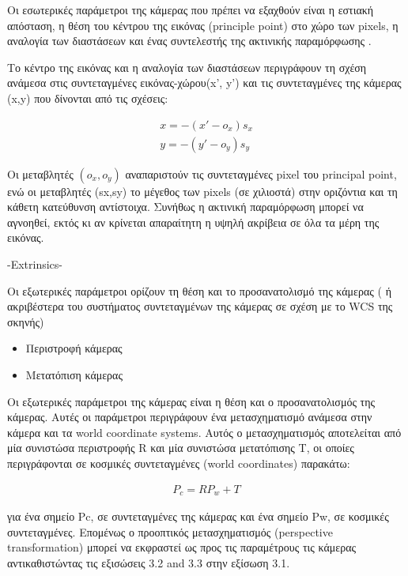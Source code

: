 Οι εσωτερικές παράμετροι της κάμερας που πρέπει να εξαχθούν είναι η εστιακή απόσταση, η θέση του κέντρου της εικόνας (principle point) στο χώρο των pixels, η αναλογία των διαστάσεων και ένας συντελεστής της ακτινικής παραμόρφωσης \cite{Malik2002}. 



Το κέντρο της εικόνας και η αναλογία των διαστάσεων περιγράφουν τη σχέση ανάμεσα στις συντεταγμένες εικόνας-χώρου(x', y') και τις συντεταγμένες της κάμερας (x,y) που δίνονται από τις σχέσεις:

\begin{equation}
\begin{aligned}
x=-(x'-o_{x})s_{x}
\\
y=-(y'-o_{y})s_{y}
\end{aligned}
\end{equation}

Οι μεταβλητές $(o_{x},o_{y})$ αναπαριστούν τις συντεταγμένες pixel του principal point, ενώ οι μεταβλητές (sx,sy) το μέγεθος των pixels (σε χιλιοστά) στην οριζόντια και τη κάθετη κατεύθυνση αντίστοιχα.
Συνήθως η ακτινική παραμόρφωση μπορεί να αγνοηθεί, εκτός κι αν κρίνεται απαραίτητη η υψηλή ακρίβεια σε όλα τα μέρη της εικόνας. 


-Extrinsics-

Οι εξωτερικές παράμετροι ορίζουν τη θέση και το προσανατολισμό της κάμερας ( ή ακριβέστερα του συστήματος συντεταγμένων της κάμερας σε σχέση με το WCS της σκηνής)


\begin{itemize}
\item Περιστροφή κάμερας
\item Μετατόπιση κάμερας
\end{itemize}



Οι εξωτερικές παράμετροι της κάμερας είναι η θέση και ο προσανατολισμός της κάμερας. Αυτές οι παράμετροι περιγράφουν ένα μετασχηματισμό ανάμεσα στην κάμερα και τα world coordinate systems.
Αυτός ο μετασχηματισμός αποτελείται από μία συνιστώσα περιστροφής R και μία συνιστώσα μετατόπισης T, οι οποίες περιγράφονται σε κοσμικές συντεταγμένες (world coordinates) παρακάτω:

\begin{equation}
\begin{aligned}
P_{c} = RP_{w}+T
\end{aligned}
\end{equation}

για ένα σημείο Pc, σε συντεταγμένες της κάμερας και ένα σημείο Pw, σε κοσμικές συντεταγμένες. Επομένως ο προοπτικός μετασχηματισμός (perspective transformation) μπορεί να εκφραστεί ως προς τις παραμέτρους τις κάμερας αντικαθιστώντας τις εξισώσεις 3.2 and 3.3 στην εξίσωση 3.1. 





